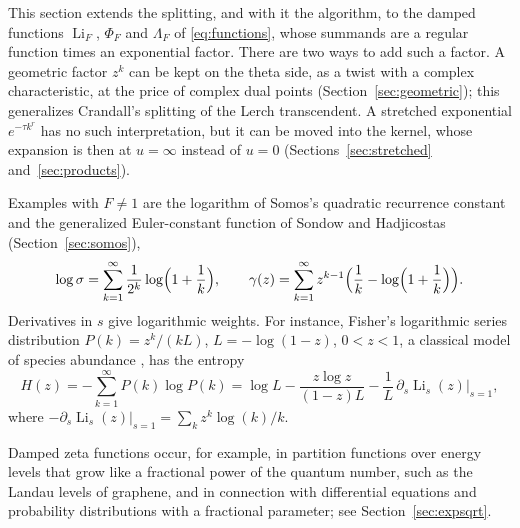 \documentclass[11pt,reqno]{amsart}
\theoremstyle{definition}
\theoremstyle{remark}
\newcommand{\Li}{\operatorname{Li}}
\begin{document}
This section extends the splitting, and with it the algorithm, to the damped functions $\Li_F$, $\Phi_F$ and
$\Lambda_F$ of \eqref{eq:functions}, whose summands are a regular function times an exponential factor. There are two
ways to add such a factor. A geometric factor $z^k$ can be kept on the theta side, as a twist with a complex
characteristic, at the price of complex dual points (Section~\ref{sec:geometric}); this generalizes Crandall's
splitting of the Lerch transcendent. A stretched exponential $e^{-\tau k^r}$ has no such interpretation, but it can be
moved into the kernel, whose expansion is then at $u = \infty$ instead of $u = 0$ (Sections~\ref{sec:stretched}
and~\ref{sec:products}).

Examples with $F \ne 1$ are the logarithm of Somos's quadratic recurrence constant and the generalized
Euler-constant function of Sondow and Hadjicostas (Section~\ref{sec:somos}),
\[
  \log\sigma = \sum_{k=1}^{\infty}\frac{1}{2^k}\log\Bigl(1+\frac1k\Bigr), \qquad
  \gamma(z) = \sum_{k=1}^{\infty}z^{k-1}\Bigl(\frac1k - \log\Bigl(1+\frac1k\Bigr)\Bigr).
\]
Derivatives in $s$ give logarithmic weights. For instance, Fisher's logarithmic series distribution
$P(k) = z^k/(kL)$, $L = -\log(1-z)$, $0 < z < 1$, a classical model of species abundance \cite{FCW43}, has the
entropy
\[
  H(z) = -\sum_{k=1}^{\infty}P(k)\log P(k) = \log L - \frac{z\log z}{(1-z)L} - \frac1L\,\partial_s\Li_s(z)\big|_{s=1},
\]
where $-\partial_s\Li_s(z)|_{s=1} = \sum_kz^k\log(k)/k$.

Damped zeta functions occur, for example, in partition functions over energy levels that grow like a fractional power
of the quantum number, such as the Landau levels of graphene, and in connection with
differential equations and probability distributions with a fractional parameter; see Section~\ref{sec:expsqrt}.
\end{document}
